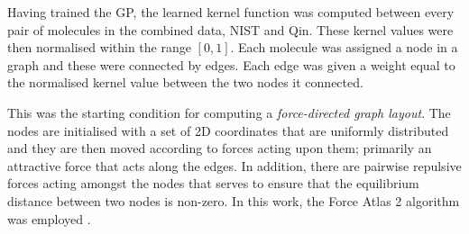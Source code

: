 Having trained the GP, the learned kernel function was computed between every
pair of molecules in the combined data, NIST and Qin. These kernel values were
then normalised within the range $[0, 1]$. Each molecule was assigned a node in
a graph and these were connected by edges. Each edge was given a weight equal to
the normalised kernel value between the two nodes it connected.

This was the starting condition for computing a \emph{force-directed graph
    layout}. The nodes are initialised with a set of 2D coordinates that are
uniformly distributed and they are then moved according to forces acting upon them;
primarily an attractive force that acts along the edges. In addition, there are
pairwise repulsive forces acting amongst the nodes that serves to ensure that
the equilibrium distance between two nodes is non-zero. In this work, the Force
Atlas 2 algorithm was employed
\cite{jacomyForceAtlas2ContinuousGraph2014,bastianGephiOpenSource2009}.
